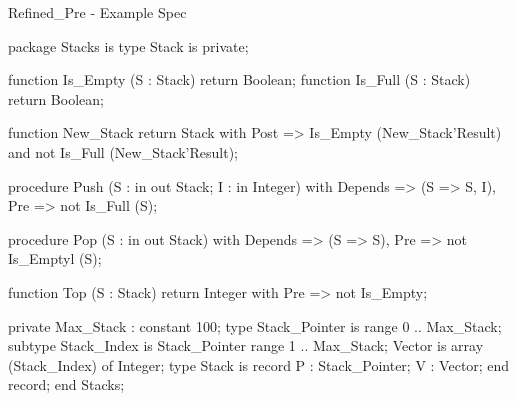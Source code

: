 \documentclass{beamer}
\begin{document}
\begin{frame}[fragile]{Refined\_Pre - Example Spec}

  \begin{pxcode}[language=SPARK,style=tinystyle,gobble=4]
    package Stacks
    is
       type Stack is private;
 
       function Is_Empty (S : Stack) return Boolean;
       function Is_Full (S : Stack) return Boolean;

       function New_Stack return Stack
       with Post => Is_Empty (New_Stack'Result) and 
                             not Is_Full (New_Stack'Result);

       procedure Push (S : in out Stack; I : in Integer)
          with Depends => (S => S, I),
                  Pre         => not Is_Full (S);

       procedure Pop (S : in out Stack)
          with Depends => (S => S),
                  Pre         => not Is_Emptyl (S);

       function Top (S : Stack) return Integer
           with Pre => not Is_Empty;

    private
        Max_Stack : constant 100;
        type Stack_Pointer is range 0 .. Max_Stack;
        subtype Stack_Index is Stack_Pointer range 1 .. Max_Stack;
        Vector is array (Stack_Index) of Integer; 
        type Stack is record
            P : Stack_Pointer;
            V : Vector;
         end record;
    end Stacks;
          
 \end{pxcode}

\end{frame}
\end{document}
